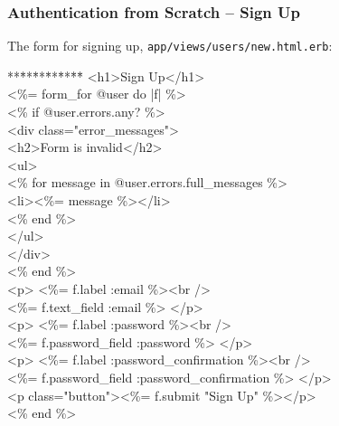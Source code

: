 \documentclass[t,handout]{beamer}
\begin{document}
\begin{frame}\frametitle{Authentication from Scratch -- Sign Up}
\vspace*{-0.125in}
The form for signing up, {\tt app/views/users/new.html.erb}:
{\tt\footnotesize \begin{tabbing} **\=**\=**\=**\=**\=**\= \kill
\> <h1>Sign Up</h1> \\ 
\> <\%= form\_for @user do |f| \%> \\
\>\>  <\% if @user.errors.any? \%> \\
\>\>\>    <div class="error\_messages"> \\
\>\>\>\>      <h2>Form is invalid</h2> \\ 
\>\>\>\>      <ul> \\
\>\>\>\>\>        <\% for message in @user.errors.full\_messages \%> \\
\>\>\>\>\>\>          <li><\%= message \%></li> \\
\>\>\>\>\>        <\% end \%> \\
\>\>\>\>      </ul> \\
\>\>\>    </div> \\
\>\>  <\% end \%> \\
\>\>  <p> <\%= f.label :email \%><br /> \\
\>\>\>\>    <\%= f.text\_field :email \%> </p> \\
\>\>  <p>  <\%= f.label :password \%><br /> \\
\>\>\>\>    <\%= f.password\_field :password \%> </p> \\
\>\>  <p> <\%= f.label :password\_confirmation \%><br /> \\
\>\>\>\>    <\%= f.password\_field :password\_confirmation \%> </p> \\
\>\>  <p class="button"><\%= f.submit  "Sign Up" \%></p> \\
\> <\% end \%>
\end{tabbing}}
\end{frame}
\end{document}
